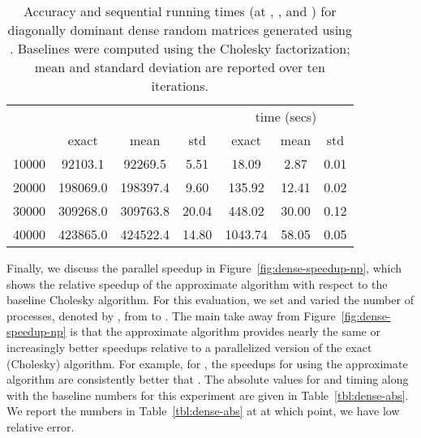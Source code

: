 \begin{table}
\center
\scriptsize
\begin{tabular}{|c|c|c|c|c|c|c|}
\hline
\multirow{2}{*}{}  &
\multicolumn{3}{|c|}{} &
\multicolumn{3}{|c|}{time (secs)} \\
\cline{2-7}
      &   exact   & mean     & std    &   exact  & mean  &  std   \\\hline
10000 &  92103.1  &  92269.5 &  5.51  &   18.09  &  2.87 &  0.01  \\\hline
20000 & 198069.0  & 198397.4 &  9.60  &  135.92  & 12.41 &  0.02  \\\hline
30000 & 309268.0  & 309763.8 & 20.04  &  448.02  & 30.00 &  0.12  \\\hline
40000 & 423865.0  & 424522.4 & 14.80  & 1043.74  & 58.05 &  0.05  \\\hline
\end{tabular}
\caption{
Accuracy and sequential running times (at , , and ) for
diagonally dominant dense random matrices generated using
.
Baselines were computed using the Cholesky factorization; mean and standard
deviation are reported over ten iterations.
}
\label{tbl:dense-dd-abs}
\normalsize
\end{table}
Finally, we discuss the parallel speedup in Figure~\ref{fig:dense-speedup-np},
which shows the relative speedup of the approximate algorithm with respect to
the baseline Cholesky algorithm.
For this evaluation, we set  and varied the number of processes, denoted by ,
from  to .
The main take away from Figure~\ref{fig:dense-speedup-np} is that the
approximate algorithm provides nearly the same or increasingly better speedups
relative to a parallelized version of the exact (Cholesky) algorithm.
For example, for , the speedups for using the approximate algorithm
are consistently better that .
The absolute values for  and timing along with the baseline
numbers for this experiment are given in Table~\ref{tbl:dense-abs}.
We report the numbers in Table~\ref{tbl:dense-abs} at  at which point, we
have low relative error.

